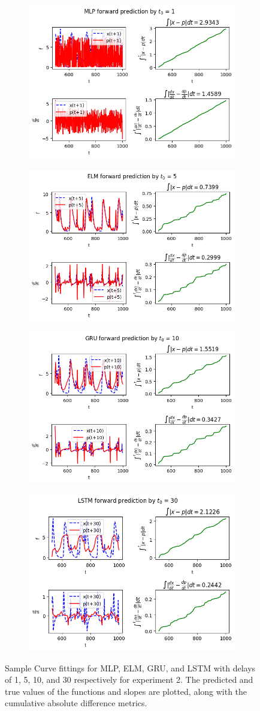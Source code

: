 \documentclass[11pt]{article}
\begin{document}
 \begin{figure}[t]
   \begin{center}
      \begin{subfigure}{0.48\textwidth}
   \includegraphics[width=.48\textwidth]{figures/MLP_1_mg2.png}
 \caption{}
      \end{subfigure}
      \begin{subfigure}{0.48\textwidth}
   \includegraphics[width=.48\textwidth]{figures/ELM_5_mg2.png}
 \caption{}
      \end{subfigure}
      \begin{subfigure}{0.48\textwidth}
   \includegraphics[width=.48\textwidth]{figures/GRU_10_mg2.png}
 \caption{}
      \end{subfigure}
      \begin{subfigure}{0.48\textwidth}
   \includegraphics[width=.48\textwidth]{figures/LSTM_30_mg2.png}
 \caption{}
      \end{subfigure}
 \end{center}
 \caption{Sample Curve fittings for MLP, ELM, GRU, and LSTM with
   delays of 1, 5, 10, and 30 respectively for experiment 2. The predicted and true
   values of the functions and slopes are plotted, along with the
   cumulative absolute difference metrics.}
 \label{fig:mg2_func}
   \end{figure}
\end{document}

